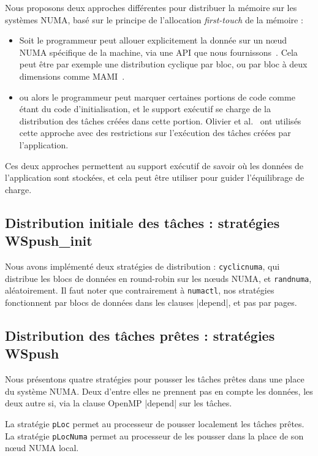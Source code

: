 \documentclass[parallelisme]{compas2016}
\begin{document}
Nous proposons deux approches différentes pour distribuer la mémoire sur les systèmes
NUMA, basé sur le principe de l'allocation \emph{first-touch} de la mémoire :
\begin{itemize}
  \item Soit le programmeur peut allouer explicitement la donnée sur un nœud NUMA
    spécifique de la machine, via une API que nous fournissons~\cite{Durand2013}.
    Cela peut être par exemple une distribution cyclique par bloc, ou par bloc à
    deux dimensions comme MAMI~\cite{BroFurGogWacNam10IJPP}.
  \item ou alors le programmeur peut marquer certaines portions de code comme
    étant du code d'initialisation, et le support exécutif se charge de la distribution
    des tâches créées dans cette portion.
    Olivier et al.~\cite{Olivier:2012:CMW:2388996.2389085} ont utilisés cette
    approche avec des restrictions sur l'exécution des tâches créées par l'application.
\end{itemize}

Ces deux approches permettent au support exécutif de savoir où les données
de l'application sont stockées, et cela peut être utiliser pour guider l'équilibrage de charge.

\vspace*{-1ex}
\subsection{Distribution initiale des tâches : stratégies WSpush\_init}

Nous avons implémenté deux stratégies de distribution : \verb/cyclicnuma/, qui
distribue les blocs de données en round-robin sur les nœuds NUMA, et \verb/randnuma/, aléatoirement.
Il faut noter que contrairement à \verb/numactl/, nos stratégies fonctionnent
par blocs de données dans les clauses |depend|, et pas par pages.


\vspace*{-1ex}
\subsection{Distribution des tâches prêtes : stratégies WSpush}

Nous présentons quatre stratégies pour pousser les tâches prêtes dans une place
du système NUMA. Deux d'entre elles ne prennent pas en compte les données, les deux
autre si, via la clause OpenMP |depend| sur les tâches.

La stratégie \verb/pLoc/ permet au processeur de pousser localement les tâches prêtes.
La stratégie \verb/pLocNuma/ permet au processeur de les pousser dans la place de son nœud NUMA local.
\end{document}
